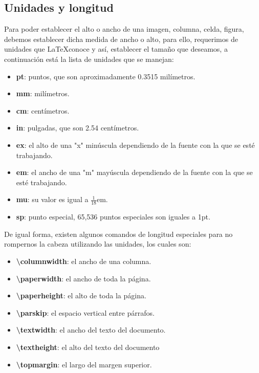 \subsection{Unidades y longitud}
\hspace{0.55cm}Para poder establecer el alto o ancho de una imagen, columna, celda, figura, debemos establecer dicha medida de ancho o alto, para ello, requerimos de unidades que \LaTeX conoce y así, establecer el tamaño que deseamos, a continuación está la lista de unidades que se manejan:
\begin{itemize}
    \item \textbf{pt}: puntos, que son aproximadamente 0.3515 milímetros.
    \item \textbf{mm}: milímetros.
    \item \textbf{cm}: centímetros.
    \item \textbf{in}: pulgadas, que son 2.54 centímetros.
    \item \textbf{ex}: el alto de una "x" minúscula dependiendo de la fuente con la que se esté trabajando.
    \item \textbf{em}: el ancho de una "m" mayúscula dependiendo de la fuente con la que se esté trabajando.
    \item \textbf{mu}: su valor es igual a $\frac{1}{18}$em.
    \item \textbf{sp}: punto especial, 65,536 puntos especiales son iguales a 1pt.
\end{itemize}

De igual forma, existen algunos comandos de longitud especiales para no rompernos la cabeza utilizando las unidades, los cuales son:
\begin{itemize}
    \item \textbf{\textbackslash{columnwidth}}: el ancho de una columna.
    \item \textbf{\textbackslash{paperwidth}}: el ancho de toda la página.
    \item \textbf{\textbackslash{paperheight}}: el alto de toda la página.
    \item \textbf{\textbackslash{parskip}}: el espacio vertical entre párrafos.
    \item \textbf{\textbackslash{textwidth}}: el ancho del texto del documento.
    \item \textbf{\textbackslash{textheight}}: el alto del texto del documento
    \item \textbf{\textbackslash{topmargin}}: el largo del margen superior.
\end{itemize}

